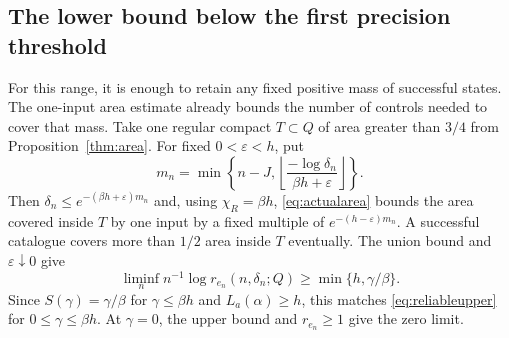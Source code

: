 \documentclass[11pt]{amsart}
\theoremstyle{definition}
\theoremstyle{remark}
\numberwithin{equation}{section}
\begin{document}
\subsection{The lower bound below the first precision threshold}
For this range, it is enough to retain any fixed positive mass of
successful states. The one-input area estimate already bounds the
number of controls needed to cover that mass.
Take one regular compact $T\subset Q$ of area greater than $3/4$
from Proposition~\ref{thm:area}. For fixed $0<\varepsilon<h$, put
\[
m_n=\min\left\{n-J,
\left\lfloor\frac{-\log\delta_n}{\beta h+\varepsilon}\right\rfloor\right\}.
\]
Then $\delta_n\le e^{-(\beta h+\varepsilon)m_n}$ and, using
$\chi_R=\beta h$, \eqref{eq:actualarea} bounds the area covered
inside $T$ by one input by a fixed multiple of
$e^{-(h-\varepsilon)m_n}$.
A successful catalogue covers more than $1/2$ area inside $T$
eventually. The union bound and $\varepsilon\downarrow0$ give
\begin{equation}\label{eq:reliablefixedmass}
\liminf_n n^{-1}\log r_{e_n}(n,\delta_n;Q)
                        \ge\min\{h,\gamma/\beta\}.
\end{equation}
Since $S(\gamma)=\gamma/\beta$ for $\gamma\le\beta h$
and $L_a(\alpha)\ge h$, this matches \eqref{eq:reliableupper}
for $0\le\gamma\le\beta h$. At $\gamma=0$, the upper bound and
$r_{e_n}\ge1$ give the zero limit.
\end{document}

